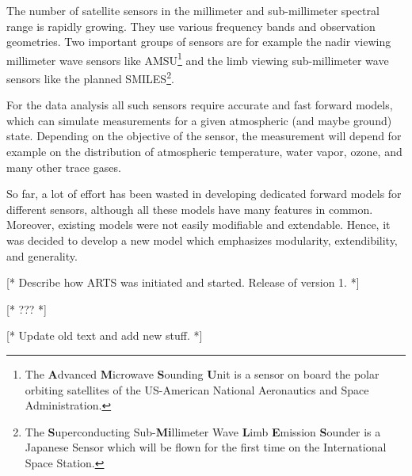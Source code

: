 \label{sec:intro:background}

The number of satellite sensors in the millimeter and sub-millimeter
spectral range is rapidly growing. They use various frequency
bands and observation geometries. Two important groups of
sensors are for example the nadir viewing millimeter wave
sensors like AMSU\footnote{The \textbf{A}dvanced
  \textbf{M}icrowave \textbf{S}ounding \textbf{U}nit is a
  sensor on board the polar orbiting satellites of the
  US-American National Aeronautics and Space Administration.}
and the limb viewing sub-millimeter wave sensors like the
planned SMILES\footnote{The \textbf{S}uperconducting
  Sub-\textbf{Mi}llimeter Wave \textbf{L}imb \textbf{E}mission
  \textbf{S}ounder is a Japanese Sensor which will be flown
  for the first time on the International Space Station.}.

For the data analysis all such sensors require accurate and
fast forward models, which can simulate measurements for a
given atmospheric (and maybe ground) state. Depending on the
objective of the sensor, the measurement will depend for
example on the distribution of atmospheric temperature, water
vapor, ozone, and many other trace gases.

So far, a lot of effort has been wasted in developing dedicated
forward models for different sensors, although all these models have
many features in common. Moreover, existing models were not easily
modifiable and extendable. Hence, it was decided to develop a new
model which emphasizes modularity, extendibility, and generality.

[* Describe how ARTS was initiated and started. Release of version 1. *]


\label{sec:intro:whatis}

[* ??? *]


\label{sec:intro:scope}

[* Update old text and add new stuff. *]


